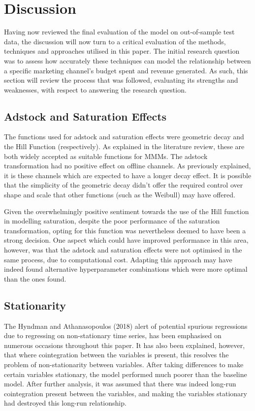 \documentclass[11pt, a4paper]{article}
\begin{document}
\section{Discussion}

Having now reviewed the final evaluation of the model on out-of-sample test data, the discussion will now turn to a critical evaluation of the methods, techniques and approaches utilised in this paper. The initial research question was to assess how accurately these techniques can model the relationship between a specific marketing channel’s budget spent and revenue generated. As such, this section will review the process that was followed, evaluating its strengths and weaknesses, with respect to answering the research question.

\subsection{Adstock and Saturation Effects}

The functions used for adstock and saturation effects were geometric decay and the Hill Function (respectively). As explained in the literature review, these are both widely accepted as suitable functions for MMMs. The adstock transformation had no positive effect on offline channels. As previously explained, it is these channels which are expected to have a longer decay effect. It is possible that the simplicity of the geometric decay didn’t offer the required control over shape and scale that other functions (such as the Weibull) may have offered. 

Given the overwhelmingly positive sentiment towards the use of the Hill function in modelling saturation, despite the poor performance of the saturation transformation, opting for this function was nevertheless deemed to have been a strong decision. One aspect which could have improved performance in this area, however, was that the adstock and saturation effects were not optimised in the same process, due to computational cost. Adapting this approach may have indeed found alternative hyperparameter combinations which were more optimal than the ones found. 

\subsection{Stationarity}

The Hyndman and Athanasopoulos (2018) alert of potential spurious regressions due to regressing on non-stationary time series, has been emphasised on numerous occasions throughout this paper. It has also been explained, however, that where cointegration between the variables is present, this resolves the problem of non-stationarity between variables. After taking differences to make certain variables stationary, the model performed much poorer than the baseline model. After further analysis, it was assumed that there was indeed long-run cointegration present between the variables, and making the variables stationary had destroyed this long-run relationship. 
\end{document}
